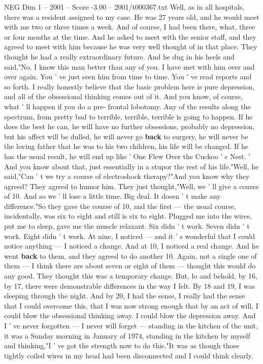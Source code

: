 \begin{textsample}{NEG Dim 1 – 2001 – Score -3.00 – 2001/t000367.txt}
Well, as in all hospitals, there was a resident assigned to my case.
He was 27 years old, and he would meet with me two or three times a week.
And of course, I had been there, what, three or four months at the time.
And he asked to meet with the senior staff, and they agreed to meet with him because he was very well thought of in that place.
They thought he had a really extraordinary future.
And he dug in his heels and said,"No.
I know this man better than any of you.
I have met with him over and over again.
You ' ve just seen him from time to time.
You ' ve read reports and so forth.
I really honestly believe that the basic problem here is pure depression, and all of the obsessional thinking comes out of it.
And you know, of course, what ' ll happen if you do a pre- frontal lobotomy.
Any of the results along the spectrum, from pretty bad to terrible, terrible, terrible is going to happen.
If he does the best he can, he will have no further obsessions, probably no depression, but his affect will be dulled, he will never go \textbf{back} to surgery, he will never be the loving father that he was to his two children, his life will be changed.
If he has the usual result, he will end up like ' One Flew Over the Cuckoo ' s Nest. ' And you know about that, just essentially in a stupor the rest of his life."Well, he said,"Can ' t we try a course of electroshock therapy?"And you know why they agreed?
They agreed to humor him.
They just thought,"Well, we ' ll give a course of 10.
And so we ' ll lose a little time.
Big deal.
It doesn ' t make any difference."So they gave the course of 10, and the first — the usual course, incidentally, was six to eight and still is six to eight.
Plugged me into the wires, put me to sleep, gave me the muscle relaxant.
Six didn ' t work.
Seven didn ' t work.
Eight didn ' t work.
At nine, I noticed — and it ' s wonderful that I could notice anything — I noticed a change.
And at 10, I noticed a real change.
And he went \textbf{back} to them, and they agreed to do another 10.
Again, not a single one of them — I think there are about seven or eight of them — thought this would do any good.
They thought this was a temporary change.
But, lo and behold, by 16, by 17, there were demonstrable differences in the way I felt.
By 18 and 19, I was sleeping through the night.
And by 20, I had the sense, I really had the sense that I could overcome this, that I was now strong enough that by an act of will, I could blow the obsessional thinking away.
I could blow the depression away.
And I ' ve never forgotten — I never will forget — standing in the kitchen of the unit, it was a Sunday morning in January of 1974, standing in the kitchen by myself and thinking,"I ' ve got the strength now to do this."It was as though those tightly coiled wires in my head had been disconnected and I could think clearly.

\end{textsample}
